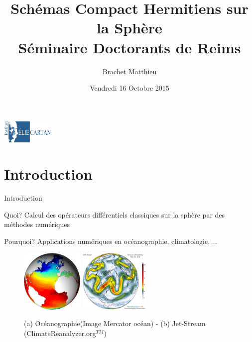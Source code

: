 \documentclass[11pt]{beamer}
\title{Schémas Compact Hermitiens sur la Sphère\\
Séminaire Doctorants de Reims}
\author{Brachet Matthieu}
\date[29.10.2015]{Vendredi 16 Octobre 2015}
\institute[IECL]{Institut Elie Cartan de Lorraine}
\begin{document}
\begin{frame}
\titlepage
\begin{center}
\includegraphics[width=2.5cm]{IECL.jpg}
\end{center}
\end{frame}

\begin{frame}
\tableofcontents
\end{frame}

\section{Introduction}
\begin{frame}{Introduction}

\begin{exampleblock}{Quoi?}
Calcul des opérateurs différentiels classiques sur la sphère par des méthodes numériques
\end{exampleblock}
\pause
\begin{exampleblock}{Pourquoi?}
Applications numériques en océanographie, climatologie, ...
\end{exampleblock}

\begin{figure}
\begin{center}
\includegraphics[height=3cm]{oceanographie.jpg}
\hspace{1cm}
\includegraphics[height=3cm]{climato.jpg}
\end{center}
\caption{(a) Océanographie(Image Mercator océan) - (b) Jet-Stream (ClimateReanalyzer.org$^{TM}$)}
\end{figure}

\end{frame}
\end{document}
